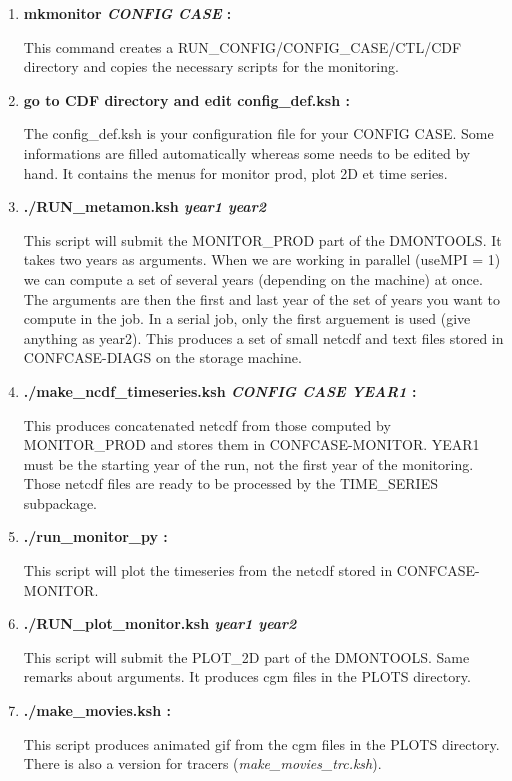 \documentclass[a4paper,11pt]{article}
\begin{document}
\begin{enumerate}
\item \textbf{mkmonitor \textit{CONFIG CASE} :}

This command creates a RUN\_CONFIG/CONFIG\_CASE/CTL/CDF directory and copies the necessary
scripts for the monitoring.

\item \textbf{go to CDF directory and edit config\_def.ksh :}

The config\_def.ksh is your configuration file for your CONFIG CASE. Some informations are
filled automatically whereas some needs to be edited by hand. It contains the menus for monitor prod,
plot 2D et time series.

\item \textbf{./RUN\_metamon.ksh \textit{year1 year2}}

This script will submit the MONITOR\_PROD part of the DMONTOOLS. It takes two years as arguments. When we are working in parallel
(useMPI = 1) we can compute a set of several years (depending on the machine) at once. The arguments are then the first and last year
of the set of years you want to compute in the job. In a serial job, only the first arguement is used (give anything as year2).
This produces a set of small netcdf and text files stored in CONFCASE-DIAGS on the storage machine.

\item \textbf{./make\_ncdf\_timeseries.ksh \textit{CONFIG CASE YEAR1} :}

This produces concatenated netcdf from those computed by MONITOR\_PROD and stores them in CONFCASE-MONITOR. 
YEAR1 must be the starting year of the run, not the first year of the monitoring.
Those netcdf files are ready to be processed by the TIME\_SERIES subpackage.

\item \textbf{./run\_monitor\_py :}

This script will plot the timeseries from the netcdf stored in CONFCASE-MONITOR. 

\item \textbf{./RUN\_plot\_monitor.ksh \textit{year1 year2}}

This script will submit the PLOT\_2D part of the DMONTOOLS. Same remarks about arguments.
It produces cgm files in the PLOTS directory.

\item \textbf{./make\_movies.ksh :}

This script produces animated gif from the cgm files in the PLOTS directory. There is also a version for tracers
(\textit{make\_movies\_trc.ksh}).

\end{enumerate}
\end{document}
